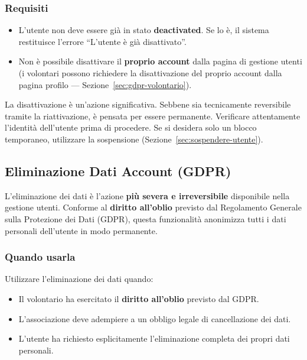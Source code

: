 \documentclass[a4paper,11pt,oneside]{book}
\begin{document}
\subsubsection{Requisiti}

\begin{itemize}[leftmargin=1.5em]
  \item L'utente non deve essere gi\`a in stato \textbf{deactivated}. Se lo \`e, il sistema restituisce l'errore ``L'utente \`e gi\`a disattivato''.
  \item Non \`e possibile disattivare il \textbf{proprio account} dalla pagina di gestione utenti (i volontari possono richiedere la disattivazione del proprio account dalla pagina profilo --- Sezione~\ref{sec:gdpr-volontario}).
\end{itemize}

\begin{warningbox}
La disattivazione \`e un'azione significativa. Sebbene sia tecnicamente reversibile tramite la riattivazione, \`e pensata per essere permanente. Verificare attentamente l'identit\`a dell'utente prima di procedere. Se si desidera solo un blocco temporaneo, utilizzare la sospensione (Sezione~\ref{sec:sospendere-utente}).
\end{warningbox}

\subsection{Eliminazione Dati Account (GDPR)}
\label{sec:gdpr-eliminazione}

L'eliminazione dei dati \`e l'azione \textbf{pi\`u severa e irreversibile} disponibile nella gestione utenti. Conforme al \textbf{diritto all'oblio} previsto dal Regolamento Generale sulla Protezione dei Dati (GDPR), questa funzionalit\`a anonimizza tutti i dati personali dell'utente in modo permanente.

\subsubsection{Quando usarla}

Utilizzare l'eliminazione dei dati quando:

\begin{itemize}[leftmargin=1.5em]
  \item Il volontario ha esercitato il \textbf{diritto all'oblio} previsto dal GDPR.
  \item L'associazione deve adempiere a un obbligo legale di cancellazione dei dati.
  \item L'utente ha richiesto esplicitamente l'eliminazione completa dei propri dati personali.
\end{itemize}
\end{document}
